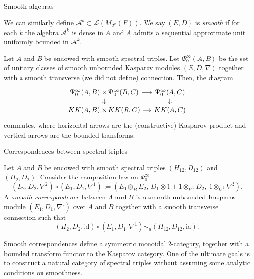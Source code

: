 \documentclass[handout]{../../../slide}
\begin{document}
\begin{frame}[fragile]{Smooth algebras}
\begin{defn}[continued]
We can similarly define $\mathcal{A}^k\subset\mathcal{L}(M_{2^k}(E))$.
We say $(E,D)$ is \emph{smooth} if for each $k$ the algebra $\mathcal{A}^k$ is dense in $A$ and $A$ admits a sequential approximate unit uniformly bounded in $\mathcal{A}^k$.
\end{defn}
\pause
\begin{thm}[\cite{MR3213549}]
Let $A$ and $B$ be endowed with smooth spectral triples.
Let $\Psi_0^\infty(A,B)$ be the set of unitary classes of smooth unbounded Kasparov modules $(E,D,\nabla)$ together with a smooth transverse (we did not define) connection.
Then, the diagram
\[\begin{tikzcd}[sep=small]
\Psi_0^\infty(A,B)\times\Psi_0^\infty(B,C) \rar\dar & \Psi_0^\infty(A,C) \dar\\
KK(A,B)\times KK(B,C) \rar & KK(A,C)
\end{tikzcd}\]
commutes, where horizontal arrows are the (constructive) Kasparov product and vertical arrows are the bounded transforms.
\end{thm}
\end{frame}



\begin{frame}{Correspondences between spectral triples}
\begin{defn}
Let $A$ and $B$ be endowed with smooth spectral triples $(H_{12},D_{12})$ and $(H_2,D_2)$.
Consider the composition law on $\Psi^\infty_0$
\[(E_2,D_2,\nabla^2)\circ(E_1,D_1,\nabla^1):=(E_1\otimes_BE_2,\ D_1\otimes1+1\otimes_{\nabla^1}D_2,\ 1\otimes_{\nabla^1}\nabla^2).\]
A \emph{smooth correspondence} between $A$ and $B$ is a smooth unbounded Kasparov module $(E_1,D_1,\nabla^1)$ over $A$ and $B$ together with a smooth transverse connection such that
\[(H_2,D_2,\mathrm{id})\circ(E_1,D_1,\nabla^1)\sim_u(H_{12},D_{12},\mathrm{id}).\]
\end{defn}
\pause
Smooth correspondences define a symmetric monoidal 2-category, together with a bounded transform functor to the Kasparov category.
One of the ultimate goals is to construct a natural category of spectral triples without assuming some analytic conditions on smoothness.
\end{frame}




\end{document}
